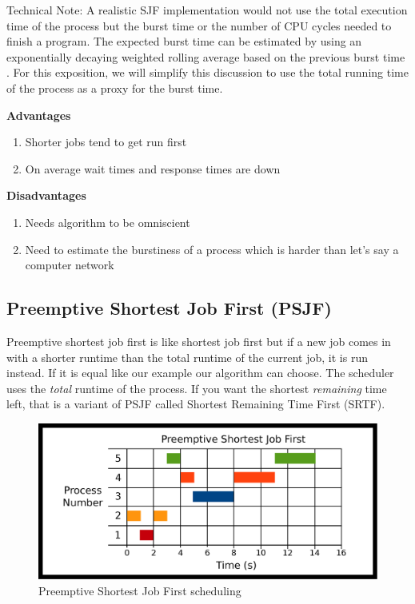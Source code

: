 Technical Note: A realistic SJF implementation would not use the total execution time of the process but the burst time or the number of CPU cycles needed to finish a program.
The expected burst time can be estimated by using an exponentially decaying weighted rolling average based on the previous burst time \cite[Chapter 6]{silberschatz2005operating}.
For this exposition, we will simplify this discussion to use the total running time of the process as a proxy for the burst time.

\textbf{Advantages}

\begin{enumerate}
  \item Shorter jobs tend to get run first
  \item On average wait times and response times are down
\end{enumerate}

\textbf{Disadvantages}
\begin{enumerate}
  \item Needs algorithm to be omniscient
  \item Need to estimate the burstiness of a process which is harder than let's say a computer network
\end{enumerate}

\subsection{Preemptive Shortest Job First (PSJF)}

Preemptive shortest job first is like shortest job first but if a new job comes in with a shorter runtime than the total runtime of the current job, it is run instead.
If it is equal like our example our algorithm can choose.
The scheduler uses the \emph{total} runtime of the process.
If you want the shortest \emph{remaining} time left, that is a variant of PSJF called Shortest Remaining Time First (SRTF).

\begin{figure}[H]
\centering
\includegraphics[width=\textwidth]{scheduling/drawings/psjf.eps}
\caption{Preemptive Shortest Job First scheduling}
\end{figure}

